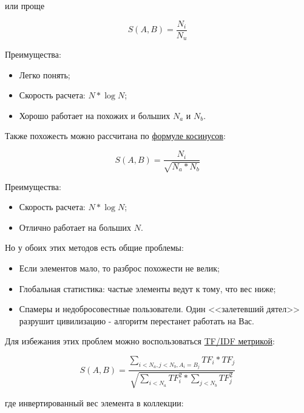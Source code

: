 или проще

\begin{equation}
 \label{eq:smlar2}
 S(A,B) = \frac{N_{i}}{N_{u}}
\end{equation}

Преимущества:

\begin{itemize}
  \item Легко понять;
  \item Скорость расчета: $N * \log{N}$;
  \item Хорошо работает на похожих и больших $N_a$ и $N_b$.
\end{itemize}

Также похожесть можно рассчитана по \href{http://en.wikipedia.org/wiki/Law\_of\_cosines}{формуле косинусов}:

\begin{equation}
 \label{eq:smlar3}
 S(A,B) = \frac{N_{i}}{\sqrt{N_{a}*N_{b}}}
\end{equation}

Преимущества:

\begin{itemize}
  \item Скорость расчета: $N * \log{N}$;
  \item Отлично работает на больших $N$.
\end{itemize}

Но у обоих этих методов есть общие проблемы:

\begin{itemize}
  \item Если элементов мало, то разброс похожести не велик;
  \item Глобальная статистика: частые элементы ведут к тому, что вес ниже;
  \item Спамеры и недобросовестные пользователи. Один <<залетевший дятел>> разрушит цивилизацию - алгоритм перестанет работать на Вас.
\end{itemize}

Для избежания этих проблем можно воспользоваться \href{http://en.wikipedia.org/wiki/Tf*idf}{TF/IDF метрикой}:

\begin{equation}
 \label{eq:smlar4}
 S(A,B) = \frac{\sum_{i < N_{a}, j < N_{b}, A_{i} = B_{j}}TF_{i} * TF_{j}}{\sqrt{\sum_{i < N_{a}}TF_{i}^{2} * \sum_{j < N_{b}}TF_{j}^{2}}}
\end{equation}

где инвертированный вес элемента в коллекции:

